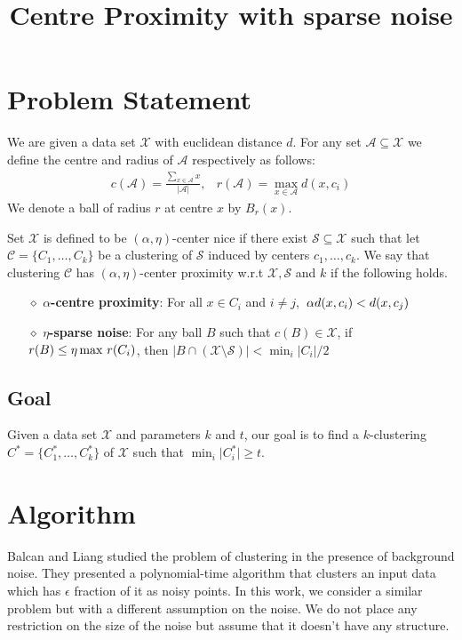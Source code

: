 \documentclass[11pt]{article}
\title{\LARGE Centre Proximity with sparse noise}
\author{}
\newcommand{\mc}{\mathcal}
\begin{document}
\maketitle

\section{Problem Statement}
We are given a data set $\mc X$ with euclidean distance $d$. For any set $\mc A\subseteq \mc X$ we define the centre and radius of $\mc A$ respectively as follows:
$$
\begin{array}{lr}
c(\mc A)= \frac{\sum_{x\in \mc A} x}{\lvert \mc A\rvert }, & r(\mc A) = \max_{x \in \mc A} d(x, c_i)
\end{array}
$$
We denote a ball of radius $r$ at centre $x$ by $B_r(x)$.

\begin{definition}
\label{defn:alphacpnoise}
Set $\mc X$ is defined to be $(\alpha, \eta)$-center nice if there exist $\mc S \subseteq \mc X$ such that 
let $\mc C= \{ C_1, \ldots, C_k \}$ be a clustering of $\mc S$ induced by centers $c_1,\ldots,c_k$. We say that clustering $\mc C$ has $(\alpha, \eta)$-center proximity w.r.t $\mc X, \mc S$ and $k$ if the following holds. 
\begin{itemize}[nolistsep, noitemsep]

\item[$\diamond$] {\bf $\alpha$-centre proximity}: For all $x \in C_i$ and $i\neq j$, $\thinspace\alpha d(x, c_i) < d(x, c_j)$
\item[$\diamond$]{\bf $\eta$-sparse noise}: For any ball $B$ such that $c(B)\in \mathcal{X}$, if $r(B)\leq \eta\max \thinspace r(C_i)$, then $|B\cap (\mc X\setminus \mc S)| < \min_i |C_i|/2$
\end{itemize}
\end{definition}

\subsection{Goal}
Given a data set $\mc X$ and parameters $k$ and $t$, our goal is to find a $k$-clustering $C^*=\{C^*_1,\ldots,C^*_k\}$ of $\mc X$ such that $\min_{i} \lvert C^*_i \rvert  \geq t$.

\section{Algorithm}
Balcan and Liang studied the problem of clustering in the presence of background noise. They presented a polynomial-time algorithm that clusters an input data which has $\epsilon$ fraction of it as noisy points. In this work, we consider a similar problem but with a different assumption on the noise. We do not place any restriction on the size of the noise but assume that it doesn't have any structure. 
\end{document}
